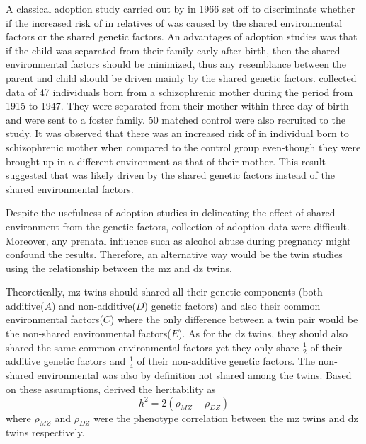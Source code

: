\documentclass[12pt]{book}
\newcommand*{\glng}{\glsentrylong}
\begin{document}
	A classical adoption study carried out by \citet{HESTON1966} in 1966 set off to discriminate whether if the increased risk of \glng{scz} in relatives of \glng{scz} was caused by the shared environmental factors or the shared genetic factors. 
	An advantages of adoption studies was that if the child was separated from their family early after birth, then the shared environmental factors should be minimized, thus any resemblance between the parent and child should be driven mainly by the shared genetic factors.
	\citet{HESTON1966} collected data of 47 individuals born from a schizophrenic mother during the period from 1915 to 1947. 
	They were separated from their mother within three day of birth and were sent to a foster family. 
	50 matched control were also recruited to the study.
	It was observed that there was an increased risk of \glng{scz} in individual born to schizophrenic mother when compared to the control group even-though they were brought up in a different environment as that of their mother.
	This result suggested that \glng{scz} was likely driven by the shared genetic factors instead of the shared environmental factors.
	
	Despite the usefulness of adoption studies in delineating the effect of shared environment from the genetic factors, collection of adoption data were difficult. 
	Moreover, any prenatal influence such as alcohol abuse during pregnancy might confound the results.
	Therefore, an alternative way would be the twin studies using the relationship between the \gls{mz} and \gls{dz} twins.
	
	Theoretically, \gls{mz} twins should shared all their genetic components (both additive($A$) and non-additive($D$) genetic factors) and also their common environmental factors($C$) where the only difference between a twin pair would be the non-shared environmental factors($E$). 
	As for the \gls{dz} twins, they should also shared the same common environmental factors yet they only share $\frac{1}{2}$ of their additive genetic factors and $\frac{1}{4}$ of their non-additive genetic factors. 
	The non-shared environmental was also by definition not shared among the twins\citep{Rijsdijk2002}.
	Based on these assumptions, \cite{Falconer1996} derived the heritability as
	\begin{equation}
	h^2 = 2(\rho_{MZ}-\rho_{DZ})
	\end{equation}
	where $\rho_{MZ}$ and $\rho_{DZ}$ were the phenotype correlation between the \gls{mz} twins and \gls{dz} twins respectively.
	
\end{document}
